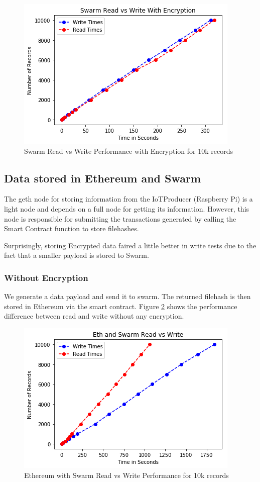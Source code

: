 \documentclass[11pt,openright]{report}
\begin{document}
\begin{figure}
	\centering
	\includegraphics[scale=1]{results/SwarmRvWEncr.png}
	\caption{Swarm Read vs Write Performance with Encryption for 10k records}
	\label{fig:graph_swarm_readvwrite_encr}
\end{figure}



\subsection{Data stored in Ethereum and Swarm}
The geth node for storing information from the IoTProducer (Raspberry Pi) is a light node and depends on a full node for getting its information. However, this node is responsible for submitting the transactions generated by calling the Smart Contract function to store filehashes.

Surprisingly, storing Encrypted data faired a little better in write tests due to the fact that a smaller payload is stored to Swarm.

\subsubsection{Without Encryption}
We generate a data payload and send it to swarm. The returned filehash is then stored in Ethereum via the smart contract. Figure \ref{fig:graph_eth_swarm_readvwrite} shows the performance difference between read and write without any encryption.

\begin{figure}
	\centering
	\includegraphics[scale=1]{results/Eth+SwRvW.png}
	\caption{Ethereum with Swarm Read vs Write Performance for 10k records}
	\label{fig:graph_eth_swarm_readvwrite}
\end{figure}
\end{document}
